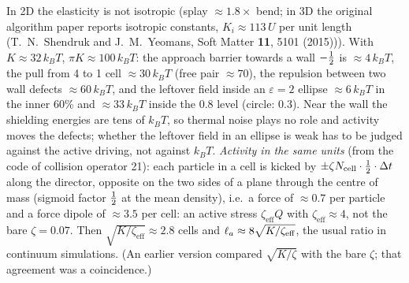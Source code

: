 In 2D the elasticity is not isotropic (splay $\approx1.8\times$ bend; in 3D the original algorithm paper reports isotropic constants,
$K_i\approx113\,U$ per unit length (T.~N.~Shendruk and J.~M.~Yeomans, Soft Matter \textbf{11}, 5101 (2015))). With $K\approx32\,k_BT$, $\pi K\approx100\,k_BT$: the approach barrier towards a wall
$-\tfrac12$ is $\approx4\,k_BT$, the pull from 4 to 1 cell $\approx30\,k_BT$ (free pair $\approx70$), the repulsion between two wall defects $\approx60\,k_BT$,
and the leftover field inside an $\varepsilon=2$ ellipse $\approx6\,k_BT$ in the inner 60\% and $\approx33\,k_BT$ inside the 0.8 level (circle: $0.3$).
Near the wall the shielding energies are tens of $k_BT$, so thermal noise plays no role and activity moves the defects; whether the leftover field in
an ellipse is weak has to be judged against the active driving, not against $k_BT$. \emph{Activity in the same units} (from the code of collision operator 21): each particle in a cell is kicked by $\pm\zeta N_\mathrm{cell}\cdot\tfrac12\cdot\Delta t$
along the director, opposite on the two sides of a plane through the centre of mass (sigmoid factor $\tfrac12$ at the mean density), i.e.\ a force of
$\approx0.7$ per particle and a force dipole of $\approx3.5$ per cell: an active stress $\zeta_\mathrm{eff}Q$ with $\zeta_\mathrm{eff}\approx4$, not the bare
$\zeta=0.07$. Then $\sqrt{K/\zeta_\mathrm{eff}}\approx2.8$ cells and $\ell_a\approx8\sqrt{K/\zeta_\mathrm{eff}}$, the usual ratio in continuum simulations.
(An earlier version compared $\sqrt{K/\zeta}$ with the bare $\zeta$; that agreement was a coincidence.)

